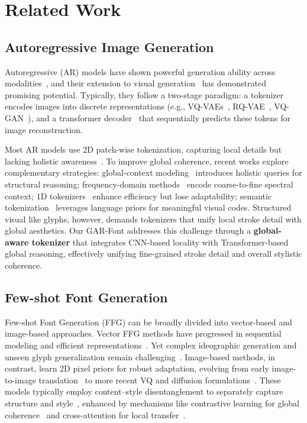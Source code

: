 \section{Related Work}
\subsection{Autoregressive Image Generation}
Autoregressive (AR) models have shown powerful generation ability across modalities~\cite{Flamingo, Videollava, llavamed, Unifiedio2}, and their extension to visual generation~\cite{ImageTransformer, llamagen, Chameleon, Emu, Emu3, januspro, simpleAR} has demonstrated promising potential. Typically, they follow a two-stage paradigm: a tokenizer encodes images into discrete representations (e.g., VQ-VAEs~\cite{VQ_VAE, VQ_VAE2}, RQ-VAE~\cite{RQ_VAE_RQ_FORMER}, VQ-GAN~\cite{VQ_GAN, VIT_VQGAN}), and a transformer decoder~\cite{MaskGIT, star_scale_wise, VAR, RAR, SpectralAR} that sequentially predicts these tokens for image reconstruction.

Most AR models use 2D patch-wise tokenization, capturing local details but lacking holistic awareness~\cite{MVTQ, EfficientVQGAN, ARPG_LocalTokens, ImageGPT}. To improve global coherence, recent works explore complementary strategies: global-context modeling~\cite{Hita} introduces holistic queries for structural reasoning; frequency-domain methods~\cite{SpectralAR, NFIG} encode coarse-to-fine spectral context; 1D tokenizers~\cite{Titok, FlexTok, InstellaT2I} enhance efficiency but lose adaptability; semantic tokenization~\cite{ImageFolder, TexTok} leverages language priors for meaningful visual codes. Structured visual like glyphs, however, demands tokenizers that unify local stroke detail with global aesthetics. Our GAR-Font addresses this challenge through a \textbf{global-aware tokenizer} that integrates CNN-based locality with Transformer-based global reasoning, effectively unifying fine-grained stroke detail and overall stylistic coherence.

\subsection{Few-shot Font Generation}
Few-shot Font Generation (FFG) can be broadly divided into vector-based and image-based approaches. Vector FFG methods have progressed in sequential modeling and efficient representations~\cite{FontRNN, Deepvecfont, DeepVecFontV2, DualVector, Vecfusion, Vecfontsdf}. Yet complex ideographic generation and unseen glyph generalization remain challenging~\cite{EasyFont, CVFont}. Image-based methods, in contrast, learn 2D pixel priors for robust adaptation, evolving from early image-to-image translation~\cite{zi2zi, word2word, zigan, HGAN} to more recent VQ and diffusion formulations~\cite{Font_Diffuser, HFH_Font, FSTDIFF, VQ_Font}. These models typically employ content–style disentanglement to separately capture structure and style~\cite{zhang2018separating, EMD, AGIS-Net, DG_Font, MX_Font, DS-Font, FineGrainedFFG, fewshotFFG, Xmpfont, Diff_Font}, enhanced by mechanisms like contrastive learning for global coherence~\cite{SCFont} and cross-attention for local transfer~\cite{Fs_Font}.  

